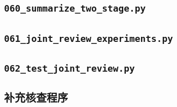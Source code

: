 \subsection*{\texttt{060\_summarize\_two\_stage.py}}

\subsection*{\texttt{061\_joint\_review\_experiments.py}}

\subsection*{\texttt{062\_test\_joint\_review.py}}

\endgroup
\subsection*{补充核查程序}





